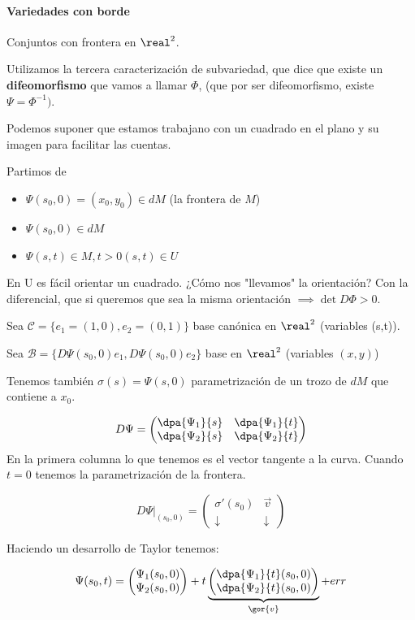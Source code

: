 \paragraph{Variedades con borde}

Conjuntos con frontera en $\real^2$.

Utilizamos la tercera caracterización de subvariedad, que dice que existe un \textbf{difeomorfismo} que vamos a llamar $\Phi$, (que por ser difeomorfismo, existe $\Psi = \Phi^{-1})$.

Podemos suponer que estamos trabajano con un cuadrado en el plano y su imagen para facilitar las cuentas.

Partimos de \begin{itemize}
\item $\Psi(s_0,0) = (x_0,y_0)\in dM$ (la frontera de $M$)
\item $\Psi(s_0,0) \in dM$
\item $\Psi(s,t) \in M, t>0 (s,t)\in U$
\end{itemize}

En U es fácil orientar un cuadrado. ¿Cómo nos "llevamos" la orientación? Con la diferencial, que si queremos que sea la misma orientación $\implies \det D\Phi > 0$.

Sea $\mathcal{C} = \{e_1=(1,0),e_2=(0,1)\}$ base canónica en $\real^2$ (variables (s,t)).

Sea $\mathcal{B} = \{D\Psi(s_0,0)e_1,D\Psi(s_0,0)e_2\}$ base en $\real^2$ (variables $(x,y)$)

Tenemos también $\sigma(s) = \Psi(s,0)$ parametrización de un trozo de $dM$ que contiene a $x_0$.

\[D\Psi = \begin{pmatrix}
\displaystyle\dpa{\Psi_1}{s} &\displaystyle\dpa{\Psi_1}{t}\\
\displaystyle\dpa{\Psi_2}{s} &\displaystyle\dpa{\Psi_2}{t}
\end{pmatrix}\]
En la primera columna lo que tenemos es el vector tangente a la curva. Cuando $t=0$ tenemos la parametrización de la frontera.

\[
D\Psi|_(s_0,0) = \begin{pmatrix}
\sigma'(s_0) & \overrightarrow{v}\\
\downarrow & \downarrow
\end{pmatrix}
\]

Haciendo un desarrollo de Taylor tenemos:

\[
\Psi(s_0,t) = \begin{pmatrix}
\Psi_1(s_0,0)\\
\Psi_2(s_0,0)
\end{pmatrix} + t \underbrace{\begin{pmatrix}
\dpa{\Psi_1}{t} (s_0,0)\\
\dpa{\Psi_2}{t} (s_0,0)
\end{pmatrix}}_{\gor{v}} + err
\]

